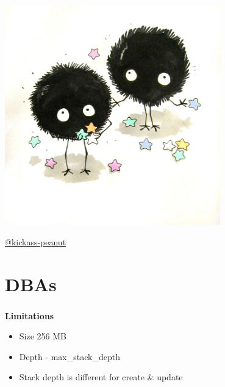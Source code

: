 \documentclass[usenames,dvipsnames, 18pt, compress, aspectratio=169]{beamer}
\begin{document}
\begin{frame}
    \frametitle{}
    \begin{center}

        \includegraphics[width=0.7\textwidth,center]{fuzzy.jpg}

        \vspace{-2cm}
        \tiny{\href{https://kickass-peanut.deviantart.com/}{@kickass-peanut}}

    \end{center}
\end{frame}

\fontsize{13pt}{14}\selectfont
\section{DBAs}
\fontsize{17pt}{18}\selectfont

\begin{frame}
    \frametitle{}
    \begin{center}
    \textbf{Limitations}

        \begin{itemize}[label={}]
            \item Size 256 MB
            \item Depth - max\_stack\_depth
            \item Stack depth is different for create \& update
        \end{itemize}

    \end{center}
\end{frame}
\end{document}
